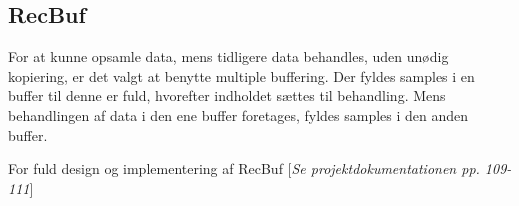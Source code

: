 \subsection{RecBuf}
For at kunne opsamle data, mens tidligere data behandles, uden unødig kopiering, er det valgt at benytte multiple buffering. Der fyldes samples i en buffer til denne er fuld, hvorefter indholdet sættes til behandling. Mens behandlingen af data i den ene buffer foretages, fyldes samples i den anden buffer.

For fuld design og implementering af RecBuf [\textit{Se projektdokumentationen pp. 109-111}]